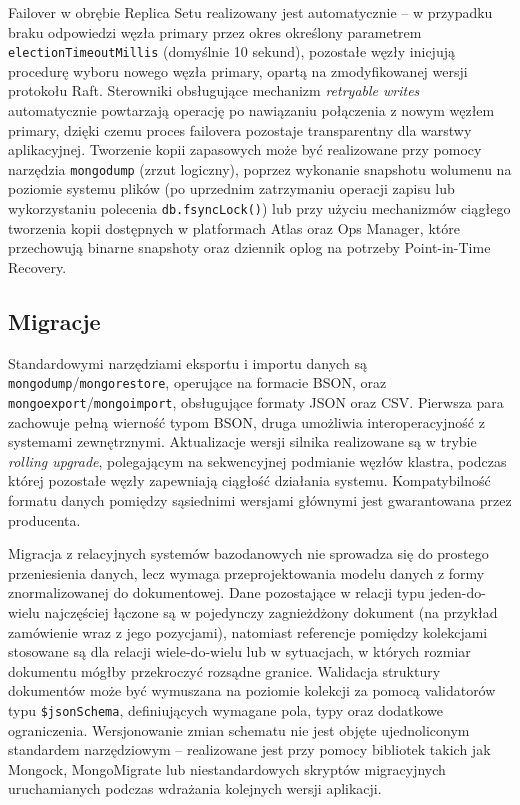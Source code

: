 Failover w obrębie Replica Setu realizowany jest automatycznie -- w przypadku
braku odpowiedzi węzła primary przez okres określony parametrem
\texttt{electionTimeoutMillis} (domyślnie 10 sekund), pozostałe węzły
inicjują procedurę wyboru nowego węzła primary, opartą na zmodyfikowanej
wersji protokołu Raft. Sterowniki obsługujące mechanizm \textit{retryable
writes} automatycznie powtarzają operację po nawiązaniu połączenia z nowym
węzłem primary, dzięki czemu proces failovera pozostaje transparentny dla
warstwy aplikacyjnej. Tworzenie kopii zapasowych może być realizowane przy
pomocy narzędzia \texttt{mongodump} (zrzut logiczny), poprzez wykonanie
snapshotu wolumenu na poziomie systemu plików (po uprzednim zatrzymaniu
operacji zapisu lub wykorzystaniu polecenia \texttt{db.fsyncLock()}) lub przy
użyciu mechanizmów ciągłego tworzenia kopii dostępnych w platformach Atlas
oraz Ops Manager, które przechowują binarne snapshoty oraz dziennik oplog
na potrzeby Point-in-Time Recovery.

\subsection{Migracje}

Standardowymi narzędziami eksportu i importu danych są
\texttt{mongodump}/\texttt{mongorestore}, operujące na formacie BSON, oraz
\texttt{mongoexport}/\texttt{mongoimport}, obsługujące formaty JSON oraz CSV.
Pierwsza para zachowuje pełną wierność typom BSON, druga umożliwia
interoperacyjność z systemami zewnętrznymi. Aktualizacje wersji silnika
realizowane są w trybie \textit{rolling upgrade}, polegającym na sekwencyjnej
podmianie węzłów klastra, podczas której pozostałe węzły zapewniają ciągłość
działania systemu. Kompatybilność formatu danych pomiędzy sąsiednimi wersjami
głównymi jest gwarantowana przez producenta.

Migracja z relacyjnych systemów bazodanowych nie sprowadza się do prostego
przeniesienia danych, lecz wymaga przeprojektowania modelu danych z formy
znormalizowanej do dokumentowej. Dane pozostające w relacji typu jeden-do-wielu
najczęściej łączone są w pojedynczy zagnieżdżony dokument (na przykład
zamówienie wraz z jego pozycjami), natomiast referencje pomiędzy kolekcjami
stosowane są dla relacji wiele-do-wielu lub w sytuacjach, w których rozmiar
dokumentu mógłby przekroczyć rozsądne granice. Walidacja struktury dokumentów
może być wymuszana na poziomie kolekcji za pomocą validatorów typu
\texttt{\$jsonSchema}, definiujących wymagane pola, typy oraz dodatkowe
ograniczenia. Wersjonowanie zmian schematu nie jest objęte ujednoliconym
standardem narzędziowym -- realizowane jest przy pomocy bibliotek takich jak
Mongock, MongoMigrate lub niestandardowych skryptów migracyjnych
uruchamianych podczas wdrażania kolejnych wersji aplikacji.

